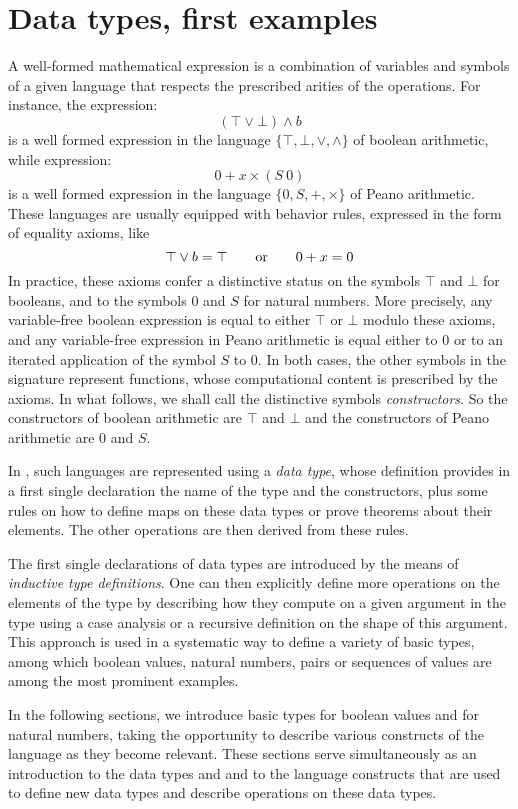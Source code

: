 \section{Data types, first examples}
\label{sec:data}
A well-formed mathematical expression is a combination of variables
and symbols of a given language
that respects the prescribed arities of
the operations. For instance, the expression:
\[(\top \vee \bot) \wedge b\]
is a well formed expression in the language $\{\top, \bot,\vee,\wedge\}$ of
boolean arithmetic, while expression:
\[ 0 + x \times (S\ 0) \]
is a well formed expression in the language $\{0,S, +, \times\}$ of
Peano arithmetic.  These languages are usually equipped with
behavior rules, expressed in the form of equality axioms, like
\[\top \vee b = \top \qquad \hbox{or} \qquad 0 + x = 0\]
In
practice, these axioms confer a distinctive status on
the symbols $\top$ and $\bot$ for booleans, and to the symbols $0$ and
$S$ for natural numbers. More precisely, any variable-free boolean expression
is equal to either $\top$ or $\bot$ modulo these axioms, and any
variable-free expression in Peano arithmetic is equal either to $0$ or
to an iterated application of the symbol $S$ to $0$.  In both
cases, the other symbols in the signature represent functions, whose
computational content is prescribed by the axioms.  In what follows,
we shall call the distinctive symbols \emph{constructors}.  So the constructors
of boolean arithmetic are \(\top\) and \(\bot\) and the constructors of
Peano arithmetic are \(0\) and \(S\).

In \Coq{}, such languages are represented using a \emph{data type},
whose definition provides in a first single declaration the name of the
type and the constructors, plus some rules on how to define maps on
these data types or prove theorems about their elements.  The other
operations are then derived from these rules.

The first single declarations of data types are introduced by the means of
\emph{inductive type definitions}.
One can then explicitly define more operations on the elements of
the type by describing how they compute on a given argument in the
type using a case analysis or a recursive definition on the
shape of this argument.
This approach is used in a systematic way to define a variety of basic
types, among which boolean values, natural numbers, pairs or
sequences of values are among the most prominent examples.

In the following sections, we introduce basic types  for boolean
values and  for natural numbers, taking the opportunity to describe
various constructs of the \Coq{} language as they become relevant.  These
sections serve simultaneously as an introduction to the data types
 and  and to the \Coq{} language constructs that
are used to define new data types and describe operations on these
data types.

